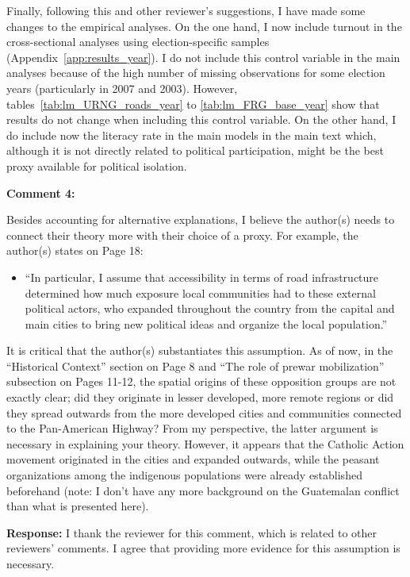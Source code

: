 \documentclass[12pt, a4paper, notitlepage]{article}
\begin{document}
Finally, following this and other reviewer's suggestions, I have made some changes to the empirical analyses. On the one hand, I now include turnout in the cross-sectional analyses using election-specific samples (Appendix~\ref{app:results_year}). I do not include this control variable in the main analyses because of the high number of missing observations for some election years (particularly in 2007 and 2003). However, tables~\ref{tab:lm_URNG_roads_year} to \ref{tab:lm_FRG_base_year} show that results do not change when including this control variable.
On the other hand, I do include now the literacy rate in the main models in the main text which, although it is not directly related to political participation, might be the best proxy available for political isolation.

\vspace{15pt}
\noindent\textbf{Comment 4:}
\begin{displayquote}
Besides accounting for alternative explanations, I believe the author(s) needs to connect their theory more with their choice of a proxy. For example, the author(s) states on Page 18:
\begin{itemize}
  \item[] ``In particular, I assume that accessibility in terms of road infrastructure determined how much exposure local communities had to these external political actors, who expanded throughout the country from the capital and main cities to bring new political ideas and organize the local population.''
\end{itemize}
It is critical that the author(s) substantiates this assumption. As of now, in the “Historical Context” section on Page 8 and “The role of prewar mobilization” subsection on Pages 11-12, the spatial origins of these opposition groups are not exactly clear; did they originate in lesser developed, more remote regions or did they spread outwards from the more developed cities and communities connected to the Pan-American Highway? From my perspective, the latter argument is necessary in explaining your theory. However, it appears that the Catholic Action movement originated in the cities and expanded outwards, while the peasant organizations among the indigenous populations were already established beforehand (note: I don’t have any more background on the Guatemalan conflict than what is presented here).
\end{displayquote}

\noindent\textbf{Response:} I thank the reviewer for this comment, which is related to other reviewers' comments. I agree that providing more evidence for this assumption is necessary.
\end{document}
